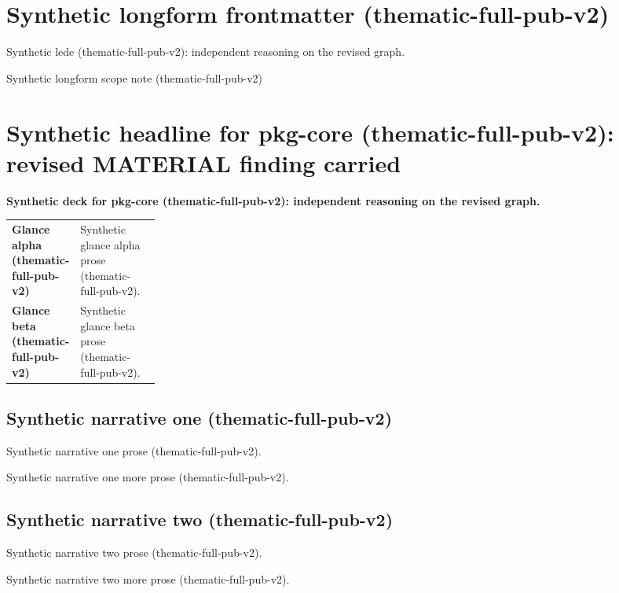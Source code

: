 \documentclass[lualatex,a4paper,10pt]{jlreq}
\begin{document}
\surveycover
\clearpage
\section*{Synthetic longform frontmatter (thematic-full-pub-v2)}
Synthetic lede (thematic-full-pub-v2): independent reasoning on the revised graph.

\begin{claimboundary}
\noindent Synthetic longform scope note (thematic-full-pub-v2)\par
\end{claimboundary}
\medskip
\tableofcontents
\clearpage
\Needspace{0.24\textheight}
\section{Synthetic headline for pkg-core (thematic-full-pub-v2): revised MATERIAL finding carried}
\label{pkg:pkg-core}
\noindent\textbf{Synthetic deck for pkg-core (thematic-full-pub-v2): independent reasoning on the revised graph.} \cite{sp001lnd001}\par\medskip
\begin{themeoverview}
\begin{tabularx}{\linewidth}{@{}>{\bfseries}p{0.22\linewidth}X@{}}
Glance alpha (thematic-full-pub-v2) & Synthetic glance alpha prose (thematic-full-pub-v2). \cite{sp001lnd001} \\
Glance beta (thematic-full-pub-v2) & Synthetic glance beta prose (thematic-full-pub-v2). \cite{sp001lnd001} \\
\end{tabularx}
\end{themeoverview}
\medskip
\begin{multicols}{2}
\subsection*{Synthetic narrative one (thematic-full-pub-v2)}
\noindent Synthetic narrative one prose (thematic-full-pub-v2). \cite{sp001lnd001}\par\medskip
\noindent Synthetic narrative one more prose (thematic-full-pub-v2). \cite{sp001lnd001}\par\medskip
\subsection*{Synthetic narrative two (thematic-full-pub-v2)}
\noindent Synthetic narrative two prose (thematic-full-pub-v2). \cite{sp001lnd001}\par\medskip
\noindent Synthetic narrative two more prose (thematic-full-pub-v2). \cite{sp001lnd001}\par\medskip
\end{multicols}
\end{document}
